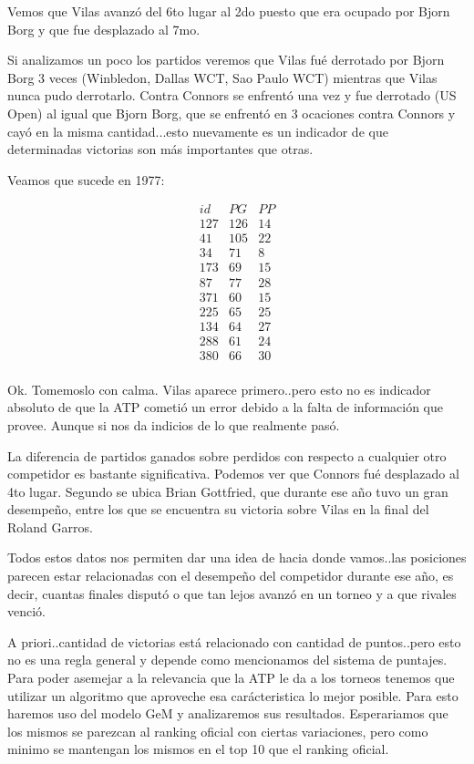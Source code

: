Vemos que Vilas avanzó del 6to lugar al 2do puesto que era ocupado por  Bjorn Borg y que fue desplazado al 7mo. 

Si analizamos un poco los partidos veremos que Vilas fué derrotado por Bjorn Borg 3 veces (Winbledon, Dallas WCT, Sao Paulo WCT) mientras que Vilas nunca pudo derrotarlo. Contra Connors se enfrentó una vez y fue derrotado (US Open) al igual que Bjorn Borg, que se enfrentó en 3 ocaciones contra Connors y cayó en la misma cantidad...esto nuevamente es un indicador de que determinadas victorias son más importantes que otras.

Veamos que sucede en 1977:

\begin{eqnarray*}
id & PG & PP \\
127 & 126 & 14 \\
41 & 105 & 22 \\
34 & 71 & 8 \\
173 & 69 & 15 \\
87 & 77 & 28 \\
371 & 60 & 15 \\
225 & 65 & 25 \\
134 & 64 & 27 \\
288 & 61 & 24 \\
380 & 66 & 30 \\
\end{eqnarray*}

Ok. Tomemoslo con calma. Vilas aparece primero..pero esto no es indicador absoluto de que la ATP cometió un error debido a la falta de información que provee. Aunque si nos da indicios de lo que realmente pasó.

La diferencia de partidos ganados sobre perdidos con respecto a cualquier otro competidor es bastante significativa. Podemos ver que Connors fué desplazado al 4to lugar. Segundo se ubica Brian Gottfried, que durante ese año tuvo un gran desempeño, entre los que se encuentra su victoria sobre Vilas en la final del Roland Garros. 

Todos estos datos nos permiten dar una idea de hacia donde vamos..las posiciones parecen estar relacionadas con el desempeño del competidor durante ese año, es decir, cuantas finales disputó o que tan lejos avanzó en un torneo y a que rivales venció.

A priori..cantidad de victorias está relacionado con cantidad de puntos..pero esto no es una regla general y depende como mencionamos del sistema de puntajes. Para poder asemejar a la relevancia que la ATP le da a los torneos tenemos que utilizar un algoritmo que aproveche esa carácteristica lo mejor posible. Para esto haremos uso del modelo GeM y analizaremos sus resultados. Esperariamos que los mismos se parezcan al ranking oficial con ciertas variaciones, pero como minimo se mantengan los mismos en el top 10 que el ranking oficial. 


